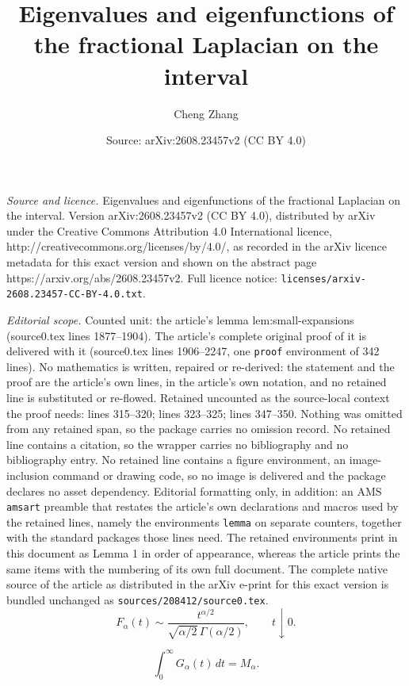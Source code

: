 \documentclass[10pt,a4paper]{amsart}
\title{Eigenvalues and eigenfunctions of the fractional Laplacian on the interval}
\author{Cheng Zhang}
\date{Source: arXiv:2608.23457v2 (CC BY 4.0)}
\begin{document}
\maketitle

\noindent\emph{Source and licence.} Eigenvalues and eigenfunctions of the fractional Laplacian on the interval. Version arXiv:2608.23457v2 (CC BY 4.0), distributed by arXiv under the Creative Commons Attribution 4.0 International licence, http://creativecommons.org/licenses/by/4.0/, as recorded in the arXiv licence metadata for this exact version and shown on the abstract page https://arxiv.org/abs/2608.23457v2. Full licence notice: \texttt{licenses/arxiv-2608.23457-CC-BY-4.0.txt}.\par\smallskip

\noindent\textit{Editorial scope.} Counted unit: the article's lemma lem:small-expansions (source0.tex lines 1877--1904). The article's complete original proof of it is delivered with it (source0.tex lines 1906--2247, one \texttt{proof} environment of 342 lines). No mathematics is written, repaired or re-derived: the statement and the proof are the article's own lines, in the article's own notation, and no retained line is substituted or re-flowed.  Retained uncounted as the source-local context the proof needs: lines 315--320; lines 323--325; lines 347--350.  Nothing was omitted from any retained span, so the package carries no omission record.  No retained line contains a citation, so the wrapper carries no bibliography and no bibliography entry.  No retained line contains a figure environment, an image-inclusion command or drawing code, so no image is delivered and the package declares no asset dependency.  Editorial formatting only, in addition: an AMS \texttt{amsart} preamble that restates the article's own declarations and macros used by the retained lines, namely the environments \texttt{lemma} on separate counters, together with the standard packages those lines need.  The retained environments print in this document as Lemma 1 in order of appearance, whereas the article prints the same items with the numbering of its own full document.  The complete native source of the article as distributed in the arXiv e-print for this exact version is bundled unchanged as \texttt{sources/208412/source0.tex}.
\begin{equation}\label{eq:F-zero}
 F_\alpha(t)\sim
 \frac{t^{\alpha/2}}
 {\sqrt{\alpha/2}\,\Gamma(\alpha/2)},
 \qquad t\downarrow0.
\end{equation}

\begin{equation}\label{eq:Gmass}
 \int_0^\infty G_\alpha(t)\,dt=M_\alpha.
\end{equation}
\end{document}
